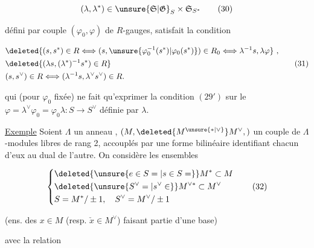 \[
 (\lambda,\lambda^*)\in\unsure{\mathfrak S|\mathfrak G}_{S}\times\mathfrak S_{S^*} \tag*{(30)}
\]

défini par  couple $(\varphi_0,\varphi)$ de $R$-gauges,
satisfait la condition

\[
 \begin{aligned}
 &\deleted{(s,s^*)\in R\Longleftrightarrow(s,\unsure{\varphi_0^{-1}(s^*)|\varphi_0(s^*)})\in R_0
 \Longleftrightarrow\lambda^{-1}s,\lambda\varphi}\ ,\\
 &\deleted{(\lambda s,(\lambda^*)^{-1}s^*)\in R}\\
 &(s,s^\vee)\in R\Longleftrightarrow(\lambda^{-1}s,\lambda^\vee s^\vee)\in R .
 \end{aligned}\tag*{(31)}
\]

 qui  (pour $\varphi_0$ fixée) ne fait qu'exprimer la condition
$(29')$ sur le $\varphi=\lambda^\vee\varphi_0=\varphi_0\lambda:S\longrightarrow S^\vee$ définie par  $\lambda$.


\uline{Exemple}  Soient $\Lambda$ un anneau , $(M,\deleted{M^{\unsure{*|\vee}}}M^\vee,)$
 un couple de $\Lambda$-modules
libres de rang 2, accouplés par une forme bilinéaire
identifiant chacun d'eux au dual de l'autre. On
considère les  ensembles

\[
 \left\{\begin{aligned}
 &\deleted{\unsure{e\in S=|s\in S=}}M^*\subset M\\
 &\deleted{\unsure{S^\vee=|s^\vee\in}}M^{\vee *}\subset M^\vee\\
 &S=M^*/\pm1,\quad S^\vee=M^\vee/\pm1
 \end{aligned}\right.\tag*{(32)}
\]

(ens. des $x\in M$  (resp. $\check{x}\in M^\vee$)
faisant partie d'une base)

avec la relation

